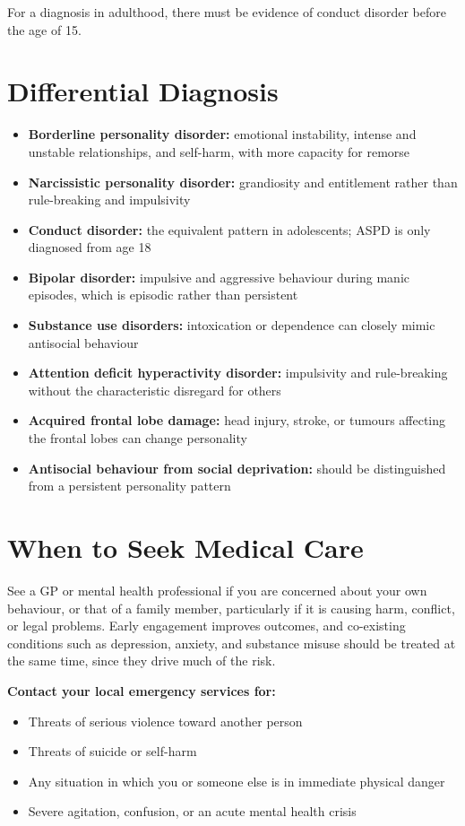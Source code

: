 For a diagnosis in adulthood, there must be evidence of conduct disorder before the age of 15.

\section*{Differential Diagnosis}
\begin{itemize}
    \item \textbf{Borderline personality disorder:} emotional instability, intense and unstable relationships, and self-harm, with more capacity for remorse
    \item \textbf{Narcissistic personality disorder:} grandiosity and entitlement rather than rule-breaking and impulsivity
    \item \textbf{Conduct disorder:} the equivalent pattern in adolescents; ASPD is only diagnosed from age 18
    \item \textbf{Bipolar disorder:} impulsive and aggressive behaviour during manic episodes, which is episodic rather than persistent
    \item \textbf{Substance use disorders:} intoxication or dependence can closely mimic antisocial behaviour
    \item \textbf{Attention deficit hyperactivity disorder:} impulsivity and rule-breaking without the characteristic disregard for others
    \item \textbf{Acquired frontal lobe damage:} head injury, stroke, or tumours affecting the frontal lobes can change personality
    \item \textbf{Antisocial behaviour from social deprivation:} should be distinguished from a persistent personality pattern
\end{itemize}

\section*{When to Seek Medical Care}
See a GP or mental health professional if you are concerned about your own behaviour, or that of a family member, particularly if it is causing harm, conflict, or legal problems. Early engagement improves outcomes, and co-existing conditions such as depression, anxiety, and substance misuse should be treated at the same time, since they drive much of the risk.

\textbf{Contact your local emergency services for:}
\begin{itemize}
    \item Threats of serious violence toward another person
    \item Threats of suicide or self-harm
    \item Any situation in which you or someone else is in immediate physical danger
    \item Severe agitation, confusion, or an acute mental health crisis
\end{itemize}

